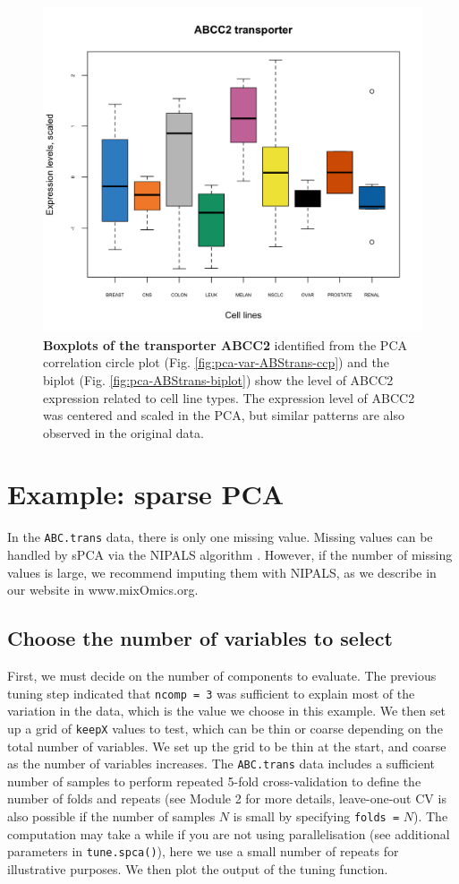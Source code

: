 \documentclass[]{book}
\begin{document}
\begin{figure}

{\centering \includegraphics[width=0.5\linewidth]{Figures/PCA/pca-ABCtrans-boxplot-1} 

}

\caption{\textbf{Boxplots of the transporter ABCC2} identified from the PCA correlation circle plot (Fig. \ref{fig:pca-var-ABStrans-ccp}) and the biplot (Fig. \ref{fig:pca-ABStrans-biplot}) show the level of ABCC2 expression related to cell line types. The expression level of ABCC2 was centered and scaled in the PCA, but similar patterns are also observed in the original data.}\label{fig:pca-ABCtrans-boxplot}
\end{figure}



\hypertarget{spca:ex}{%
\section{Example: sparse PCA}\label{spca:ex}}

In the \texttt{ABC.trans} data, there is only one missing value. Missing values can be handled by sPCA via the NIPALS algorithm . However, if the number of missing values is large, we recommend imputing them with NIPALS, as we describe in our website in www.mixOmics.org.

\hypertarget{tuning-spca}{%
\subsection{Choose the number of variables to select}\label{tuning-spca}}

First, we must decide on the number of components to evaluate. The previous tuning step indicated that \texttt{ncomp\ =\ 3} was sufficient to explain most of the variation in the data, which is the value we choose in this example. We then set up a grid of \texttt{keepX} values to test, which can be thin or coarse depending on the total number of variables. We set up the grid to be thin at the start, and coarse as the number of variables increases. The \texttt{ABC.trans} data includes a sufficient number of samples to perform repeated 5-fold cross-validation to define the number of folds and repeats (see Module 2 for more details, leave-one-out CV is also possible if the number of samples \(N\) is small by specifying \texttt{folds\ =} \(N\)). The computation may take a while if you are not using parallelisation (see additional parameters in \texttt{tune.spca()}), here we use a small number of repeats for illustrative purposes. We then plot the output of the tuning function.
\end{document}

